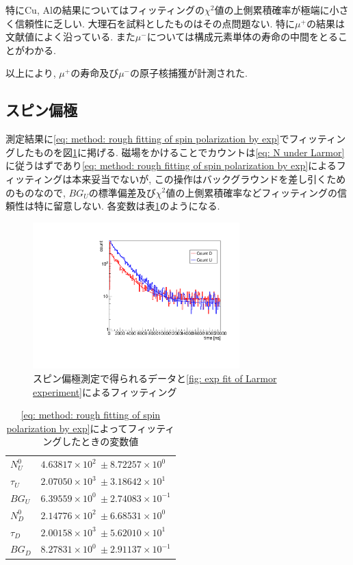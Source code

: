 \documentclass[dvipdfmx]{jsarticle}
\begin{document}
特にCu, Alの結果についてはフィッティングの$\chi^2$値の上側累積確率が極端に小さく信頼性に乏しい.
大理石を試料としたものはその点問題ない.
特に$\mu^+$の結果は文献値によく沿っている.
また$\mu^-$については構成元素単体の寿命の中間をとることがわかる.

以上により, $\mu^+$の寿命及び$\mu^-$の原子核捕獲が計測された.


\subsection{スピン偏極}

測定結果に\eqref{eq: method: rough fitting of spin polarization by exp}でフィッティングしたものを図\ref{fig: exp fit of Larmor experiment}に掲げる.
磁場をかけることでカウントは\eqref{eq: N under Larmor}に従うはずであり\eqref{eq: method: rough fitting of spin polarization by exp}によるフィッティングは本来妥当でないが, この操作はバックグラウンドを差し引くためのものなので, $BG_U$の標準偏差及び$\chi^2$値の上側累積確率などフィッティングの信頼性は特に留意しない.
各変数は表\ref{table: result: parameters of result with B fit with exp}のようになる.

\begin{figure}
    \centering
    \includegraphics[width=8cm]{../img/results/expFit.pdf}
    \caption{スピン偏極測定で得られるデータと\eqref{fig: exp fit of Larmor experiment}によるフィッティング}
    \label{fig: exp fit of Larmor experiment}
\end{figure}

\begin{table}
    \centering
    \caption{\eqref{eq: method: rough fitting of spin polarization by exp}によってフィッティングしたときの変数値}
    \begin{tabular}[]{ll}
        \toprule
        $N_U^0$ & $4.63817\times10^2\:\pm8.72257\times10^0$
        \\
        $\tau_U$ & $2.07050\times10^3\:\pm3.18642\times10^1$
        \\
        $BG_U$ & $6.39559\times10^0\:\pm2.74083\times10^{-1}$
        \\
        \midrule
        $N_D^0$ & $2.14776\times10^2\:\pm6.68531\times10^0$
        \\
        $\tau_D$ & $2.00158\times10^3\:\pm5.62010\times10^1$
        \\
        $BG_D$ & $8.27831\times10^0\:\pm2.91137\times10^{-1}$
        \\
        \bottomrule
    \end{tabular}
    \label{table: result: parameters of result with B fit with exp}
\end{table}
\end{document}
